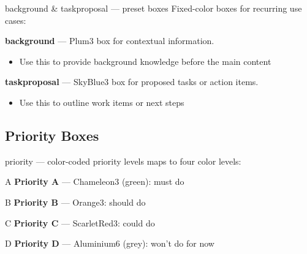 \documentclass[presentation, aspectratio=169]{beamer}
\begin{document}
\begin{frame}{background \& taskproposal --- preset boxes}
  Fixed-color boxes for recurring use cases:

  \vspace{0.3em}
  \begin{background}
    \textbf{background} --- Plum3 box for contextual information.
    \begin{itemize}
      \item Use this to provide background knowledge before the main content
    \end{itemize}
  \end{background}

  \vspace{0.4em}
  \begin{taskproposal}
    \textbf{taskproposal} --- SkyBlue3 box for proposed tasks or action items.
    \begin{itemize}
      \item Use this to outline work items or next steps
    \end{itemize}
  \end{taskproposal}
\end{frame}

\subsection{Priority Boxes}

\begin{frame}{priority --- color-coded priority levels}
   maps to four color levels:

  \vspace{0.3em}
  \begin{priority}{A}
    \textbf{Priority A} --- Chameleon3 (green): must do
  \end{priority}
  \vspace{0.2em}
  \begin{priority}{B}
    \textbf{Priority B} --- Orange3: should do
  \end{priority}
  \vspace{0.2em}
  \begin{priority}{C}
    \textbf{Priority C} --- ScarletRed3: could do
  \end{priority}
  \vspace{0.2em}
  \begin{priority}{D}
    \textbf{Priority D} --- Aluminium6 (grey): won't do for now
  \end{priority}
\end{frame}
\end{document}
